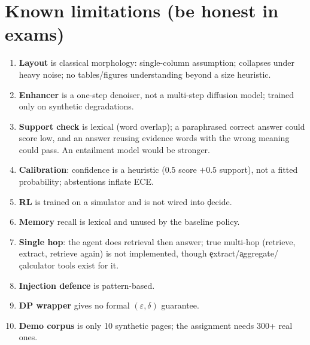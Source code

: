 \section{Known limitations (be honest in exams)}
\begin{enumerate}
 \item \textbf{Layout} is classical morphology: single-column assumption; collapses under heavy noise; no tables/figures understanding beyond a size heuristic.
 \item \textbf{Enhancer} is a one-step denoiser, not a multi-step diffusion model; trained only on synthetic degradations.
 \item \textbf{Support check} is lexical (word overlap); a paraphrased correct answer could score low, and an answer reusing evidence words with the wrong meaning could pass. An entailment model would be stronger.
 \item \textbf{Calibration}: confidence is a heuristic ($0.5$ score $+0.5$ support), not a fitted probability; abstentions inflate ECE.
 \item \textbf{RL} is trained on a simulator and is not wired into \c{decide}.
 \item \textbf{Memory} recall is lexical and unused by the baseline policy.
 \item \textbf{Single hop}: the agent does retrieval then answer; true multi-hop (retrieve, extract, retrieve again) is not implemented, though \c{extract}/\c{aggregate}/\c{calculator} tools exist for it.
 \item \textbf{Injection defence} is pattern-based.
 \item \textbf{DP wrapper} gives no formal $(\varepsilon,\delta)$ guarantee.
 \item \textbf{Demo corpus} is only 10 synthetic pages; the assignment needs 300+ real ones.
\end{enumerate}


